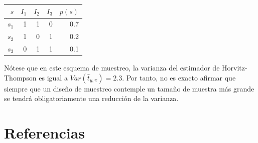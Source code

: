 \documentclass[
  12pt,
  spanish,
]{book}
\begin{document}
\begin{longtable}[]{@{}rrrrr@{}}
\toprule
\(s\) & \(I_1\) & \(I_2\) & \(I_3\) & \(p(s)\) \\
\midrule
\endhead
\(s_1\) & 1 & 1 & 0 & 0.7 \\
\(s_2\) & 1 & 0 & 1 & 0.2 \\
\(s_3\) & 0 & 1 & 1 & 0.1 \\
\bottomrule
\end{longtable}

Nótese que en este esquema de muestreo, la varianza del estimador de Horvitz-Thompson es igual a \(Var(\hat t_{y, \pi}) = 2.3\). Por tanto, no es exacto afirmar que siempre que un diseño de muestreo contemple un tamaño de muestra más grande se tendrá obligatoriamente una reducción de la varianza.

\hypertarget{referencias}{%
\chapter*{Referencias}\label{referencias}}

  
\end{document}
